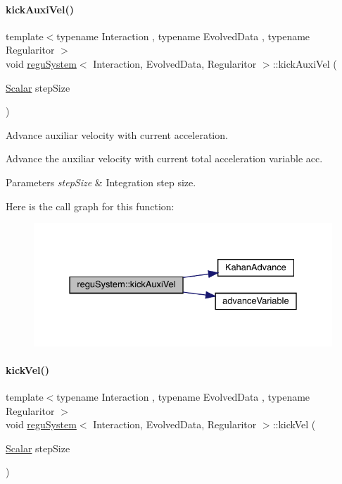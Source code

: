 \paragraph{\texorpdfstring{kick\+Auxi\+Vel()}{kickAuxiVel()}}
{\footnotesize\ttfamily template$<$typename Interaction , typename Evolved\+Data , typename Regularitor $>$ \\
void \mbox{\hyperlink{classregu_system}{regu\+System}}$<$ Interaction, Evolved\+Data, Regularitor $>$\+::kick\+Auxi\+Vel (\begin{DoxyParamCaption}\item[{\mbox{\hyperlink{classregu_system_aca8ee2c387943164ee3ea68370fc3ac0}{Scalar}}}]{step\+Size }\end{DoxyParamCaption})\hspace{0.3cm}{\ttfamily [private]}}



Advance auxiliar velocity with current acceleration. 

Advance the auxiliar velocity with current total acceleration variable \textquotesingle{}acc\textquotesingle{}. 
\begin{DoxyParams}{Parameters}
{\em step\+Size} & Integration step size. \\
\hline
\end{DoxyParams}
Here is the call graph for this function\+:\nopagebreak
\begin{figure}[H]
\begin{center}
\leavevmode
\includegraphics[width=331pt]{classregu_system_a53e1d725a1df2b65029f622a17364b1e_cgraph}
\end{center}
\end{figure}
\mbox{\label{classregu_system_a16cf42c1efb79a8ed5f9fecad7ad13dc}} 
\paragraph{\texorpdfstring{kick\+Vel()}{kickVel()}}
{\footnotesize\ttfamily template$<$typename Interaction , typename Evolved\+Data , typename Regularitor $>$ \\
void \mbox{\hyperlink{classregu_system}{regu\+System}}$<$ Interaction, Evolved\+Data, Regularitor $>$\+::kick\+Vel (\begin{DoxyParamCaption}\item[{\mbox{\hyperlink{classregu_system_aca8ee2c387943164ee3ea68370fc3ac0}{Scalar}}}]{step\+Size }\end{DoxyParamCaption})\hspace{0.3cm}{\ttfamily [private]}}



